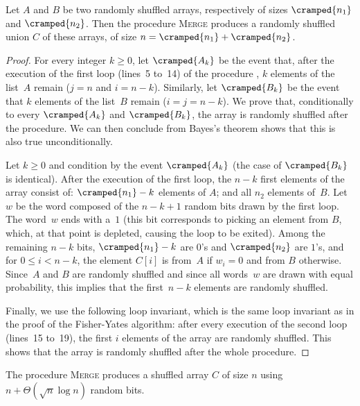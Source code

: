 \documentclass[letter,11pt,en]{quick-document}
\begin{document}
\begin{lemma}
  Let $A$ and $B$ be two randomly shuffled arrays, respectively of sizes
  $\cramped{n_1}$ and $\cramped{n_2}$. Then the procedure \textsc{Merge}
  produces a randomly shuffled union $C$ of these arrays, of size
  $n=\cramped{n_1}+\cramped{n_2}$.
\end{lemma}

\begin{proof}
  For every integer $k\geqslant 0$, let $\cramped{A_k}$ be the event that,
  after the execution of the first loop (lines~5 to~14) of the procedure
  , $k$ elements of the list~$A$ remain ($j = n$ and
  $i = n-k$). Similarly, let $\cramped{B_k}$ be the event that $k$
  elements of the list~$B$ remain ($i = j = n-k$). We prove that,
  conditionally to every $\cramped{A_k}$ and $\cramped{B_k}$, the array is
  randomly shuffled after the procedure. We can then conclude from Bayes's
  theorem shows that this is also true unconditionally.

  Let $k \geqslant 0$ and condition by the event $\cramped{A_k}$ (the case
  of $\cramped{B_k}$ is identical). After the execution of the first loop,
  the $n-k$ first elements of the array consist of: $\cramped{n_1} - k$
  elements of $A$; and all $n_2$ elements of~$B$. Let $w$ be the word
  composed of the $n-k+1$ random bits drawn by the first loop. The
  word~$w$ ends with a~$1$ (this bit corresponds to picking an element
  from $B$, which, at that point is depleted, causing the loop to be
  exited). Among the remaining $n-k$ bits, $\cramped{n_1}-k$ are $0$'s and
  $\cramped{n_2}$ are $1$'s, and for $0\leqslant i < n-k$, the element
  $C[i]$ is from~$A$ if $w_i = 0$ and from $B$ otherwise. Since~$A$ and
  $B$ are randomly shuffled and since all words~$w$ are drawn with equal
  probability, this implies that the first~$n-k$ elements are randomly
  shuffled.

  Finally, we use the following loop invariant, which is the same loop
  invariant as in the proof of the Fisher-Yates algorithm: after every
  execution of the second loop (lines~15 to~19), the first $i$ elements of
  the array are randomly shuffled. This shows that the array is randomly
  shuffled after the whole procedure.
\end{proof}




\begin{lemma}
  The procedure \textsc{Merge} produces a shuffled array $C$ of size $n$
  using $n + \Theta(\sqrt{n}\log n)$ random bits.
\end{lemma}
\end{document}
